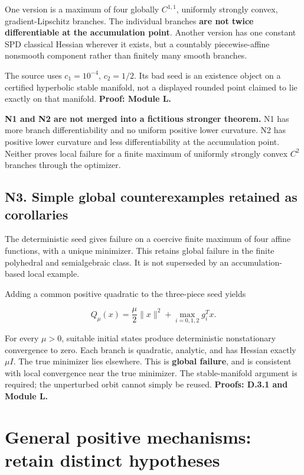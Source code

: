\documentclass[10pt,oneside,openany]{book}
\theoremstyle{remark}\newtheorem{remark}{Remark}[chapter]
\begin{document}
One version is a maximum of four globally \(C^{1,1}\), uniformly strongly convex, gradient-Lipschitz branches. The individual branches \textbf{are not twice differentiable at the accumulation point}. Another version has one constant SPD classical Hessian wherever it exists, but a countably piecewise-affine nonsmooth component rather than finitely many smooth branches.

The source uses \(c_1=10^{-4}\), \(c_2=1/2\). Its bad seed is an existence object on a certified hyperbolic stable manifold, not a displayed rounded point claimed to lie exactly on that manifold. \textbf{Proof: Module L.}

\textbf{N1 and N2 are not merged into a fictitious stronger theorem.} N1 has more branch differentiability and no uniform positive lower curvature. N2 has positive lower curvature and less differentiability at the accumulation point. Neither proves local failure for a finite maximum of uniformly strongly convex \(C^2\) branches through the optimizer.

\subsection{N3. Simple global counterexamples retained as corollaries}\label{n3.-simple-global-counterexamples-retained-as-corollaries}

The deterministic seed gives failure on a coercive finite maximum of four affine functions, with a unique minimizer. This retains global failure in the finite polyhedral and semialgebraic class. It is not superseded by an accumulation-based local example.

Adding a common positive quadratic to the three-piece seed yields

\[
 Q_\mu(x)=\frac\mu2\|x\|^2+\max_{i=0,1,2}g_i^Tx.
\]

For every \(\mu>0\), suitable initial states produce deterministic nonstationary convergence to zero. Each branch is quadratic, analytic, and has Hessian exactly \(\mu I\). The true minimizer lies elsewhere. This is \textbf{global failure}, and is consistent with local convergence near the true minimizer. The stable-manifold argument is required; the unperturbed orbit cannot simply be reused. \textbf{Proofs: D.3.1 and Module L.}

\section{General positive mechanisms: retain distinct hypotheses}\label{general-positive-mechanisms-retain-distinct-hypotheses}
\end{document}
